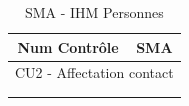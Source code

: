 

\begin{table}[H]
\centering
\caption{SMA - IHM Personnes}
\begin{tabular}{ll}
\hline
\multicolumn{1}{c}{Num Contrôle} & \multicolumn{1}{c}{SMA} \\ \hline
\multicolumn{2}{c}{CU2 - Affectation contact}              \\
                                 &                         \\
                                 &                         \\ \hline
\end{tabular}
\end{table}




